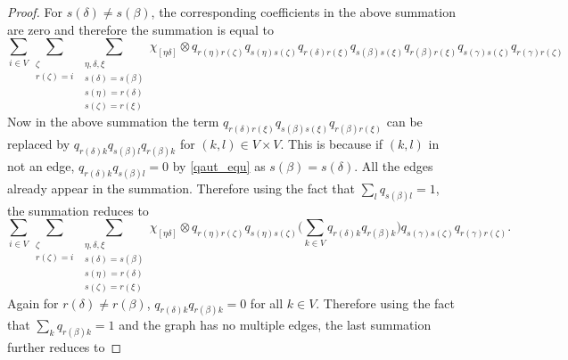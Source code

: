 \documentclass{amsart}
\theoremstyle{plain}
\theoremstyle{definition}
\theoremstyle{remark}
\numberwithin{equation}{section}
\begin{document}
\begin{proof}
For $s(\delta)\neq s(\beta)$, the corresponding coefficients in the above summation are zero and therefore the summation is equal to
\begin{equation*}
    \sum\limits_{i\in V}\sum\limits_{\substack{\zeta \\
r(\zeta)=i}}\sum\limits_{\substack{\eta,\delta,\xi \\ s(\delta)=s(\beta) \\ s(\eta)=r(\delta) \\ s(\zeta)=r(\xi)}}\chi_{[\eta\delta]} \otimes q_{r(\eta)r(\zeta)}q_{s(\eta)s(\zeta)}q_{r(\delta)r(\xi)}q_{s(\beta)s(\xi)}q_{r(\beta)r(\xi)}q_{s(\gamma)s(\zeta)}q_{r(\gamma)r(\zeta)}
\end{equation*}
Now in the above summation the term $q_{r(\delta)r(\xi)}q_{s(\beta)s(\xi)}q_{r(\beta)r(\xi)}$ can be replaced by $q_{r(\delta)k}q_{s(\beta)l}q_{r(\beta)k}$ for $(k,l)\in V\times V$. This is because if $(k,l)$ in not an edge, $q_{r(\delta)k}q_{s(\beta)l}=0$ by \ref{qaut_equ} as $s(\beta)=s(\delta)$. All the edges already appear in the summation. Therefore using the fact that $\sum_{l}q_{s(\beta)l}=1$, the summation reduces to 
\begin{equation*}
    \sum\limits_{i\in V}\sum\limits_{\substack{\zeta \\
r(\zeta)=i}}\sum\limits_{\substack{\eta,\delta,\xi \\ s(\delta)=s(\beta) \\ s(\eta)=r(\delta) \\ s(\zeta)=r(\xi)}}\chi_{[\eta\delta]} \otimes q_{r(\eta)r(\zeta)}q_{s(\eta)s(\zeta)}\Big(\sum\limits_{k\in V}q_{r(\delta)k}q_{r(\beta)k}\Big)q_{s(\gamma)s(\zeta)}q_{r(\gamma)r(\zeta)}.
\end{equation*}
Again for $r(\delta)\neq r(\beta)$, $q_{r(\delta)k}q_{r(\beta)k}=0$ for all $k\in V$. Therefore using the fact that $\sum_{k}q_{r(\beta)k}=1$ and the graph has no multiple edges, the last summation further reduces to

\end{proof}
\end{document}
